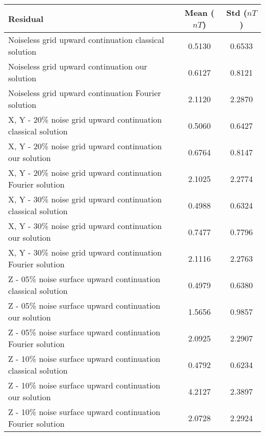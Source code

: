 {
	\begin{center}
		\begin{tabular}[]{|l|c|c|}
			\hline
			Residual                                                      & Mean ($nT$) & Std ($nT$) \\
			\hline
			Noiseless grid upward continuation classical solution         & 0.5130 & 0.6533 \\
			\hline
			Noiseless grid upward continuation our solution               & 0.6127 & 0.8121 \\
			\hline
			Noiseless grid upward continuation Fourier solution           & 2.1120 & 2.2870 \\
			\hline
			X, Y - 20\% noise grid upward continuation classical solution & 0.5060 & 0.6427 \\
			\hline
			X, Y - 20\% noise grid upward continuation our solution       & 0.6764 & 0.8147 \\
			\hline
			X, Y - 20\% noise grid upward continuation Fourier solution   & 2.1025 & 2.2774 \\
			\hline
			X, Y - 30\% noise grid upward continuation classical solution & 0.4988 & 0.6324 \\
			\hline
			X, Y - 30\% noise grid upward continuation our solution       & 0.7477 & 0.7796 \\
			\hline
			X, Y - 30\% noise grid upward continuation Fourier solution   & 2.1116 & 2.2763 \\
			\hline
			Z - 05\% noise surface upward continuation classical solution & 0.4979 & 0.6380 \\
			\hline
			Z - 05\% noise surface upward continuation our solution       & 1.5656 & 0.9857 \\
			\hline
			Z - 05\% noise surface upward continuation Fourier solution   & 2.0925 & 2.2907 \\
			\hline
			Z - 10\% noise surface upward continuation classical solution & 0.4792 & 0.6234 \\
			\hline
			Z - 10\% noise surface upward continuation our solution       & 4.2127 & 2.3897 \\
			\hline
			Z - 10\% noise surface upward continuation Fourier solution   & 2.0728 & 2.2924 \\
			\hline
		\end{tabular}
	\end{center} 
}

